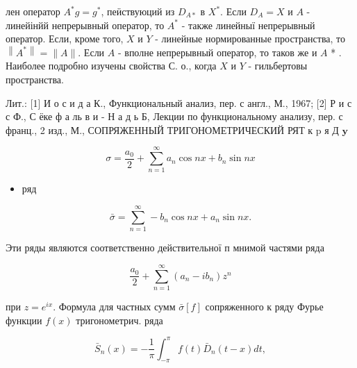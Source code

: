 \documentclass[10pt]{article}
\begin{document}
лен оператор $A^{*} g=g^{*}$, пеӥствуюций из $D_{A *}$ в $X^{*}$. Если $D_{A}=X$ и $A$ - линейінйй непрерывный оператор, то $A^{*}$ - также линейныї непрерывный оператор. Если, кроме того, $X$ и $Y$ - линейные нормированные пространства, то $\left\|A^{*}\right\|=\|A\|$. Если $A$ - вполне непрерывный оператор, то таков же и $A$ * . Наиболее подробно изучены свойства С. о., когда $X$ и $Y$ - гильбертовы пространства.



Лит.: [1] И о с и д а К., Функциональный анализ, пер. с англ., М., 1967; [2] Р и с с Ф., С ёке ф а ль в и - Н а д ь Б, Лекции по функциональному анализу, пер. с франц., 2 изд., М., СОПРЯЖЕННЫЙ ТРИГОНОМЕТРИЧЕСКИЙ РЯТ к $\mathrm{p}$ я Д $\mathbf{y}$



\[

\sigma=\frac{a_{0}}{2}+\sum_{n=1}^{\infty} a_{n} \cos n x+b_{n} \sin n x

\]



\begin{itemize}

  \item ряд

\end{itemize}



\[

\bar{\sigma}=\sum_{n=1}^{\infty}-b_{n} \cos n x+a_{n} \sin n x .

\]



Эти ряды являются соответственно действительної п мнимой частями ряда



\[

\frac{a_{0}}{2}+\sum_{n=1}^{\infty}\left(a_{n}-i b_{n}\right) z^{n}

\]



при $z=e^{i x}$. Формула для частных сумм $\bar{\sigma}[f]$ сопряженного к ряду Фурье функции $f(x)$ тригонометрич. ряда



\[

\bar{S}_{n}(x)=-\frac{1}{\pi} \int_{-\pi}^{\pi} f(t) \bar{D}_{n}(t-x) d t,

\]
\end{document}
